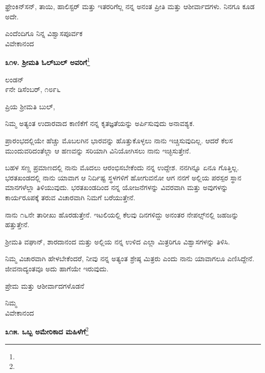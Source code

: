 ಫ್ರೇಂಕಿನ್‌ಸನ್, ತಾಯಿ, ಹಾಲಿಸ್ಟರ್ ಮತ್ತು ಇತರರಿಗೆಲ್ಲ ನನ್ನ ಅನಂತ ಪ್ರೀತಿ ಮತ್ತು ಆಶೀರ್ವಾದಗಳು. ನಿನಗೂ ಕೂಡ ಅದೇ.

\vspace{-0.5cm}

{\flushright
ಎಂದೆಂದಿಗೂ ನಿನ್ನ ವಿಶ್ವಾಸಪೂರ್ವಕ\\ವಿವೇಕಾನಂದ\par}

\begin{center}
\textbf{೩೧೪. ಶ‍್ರೀಮತಿ ಓಲ್‌ಬುಲ್‌ ಅವರಿಗೆ}\footnote{}
\end{center}

\vspace{-0.5cm}

\begin{flushright}
ಲಂಡನ್\\೯ನೇ ಡಿಸೆಂಬರ್, ೧೮೯೬
\end{flushright}

\vspace{-0.3cm}

\noindent
ಪ್ರಿಯ ಶ‍್ರೀಮತಿ ಬುಲ್,

ನಿಮ್ಮ ಅತ್ಯಂತ ಉದಾರವಾದ ಕಾಣಿಕೆಗೆ ನನ್ನ ಕೃತಜ್ಞತೆಯನ್ನು ಅರ್ಪಿಸುವುದು ಅನಾವಶ್ಯಕ.

ಪ್ರಾರಂಭದಲ್ಲಿಯೇ ಹೆಚ್ಚು ಮೊಬಲಗಿನ ಭಾರವನ್ನು ಹೊತ್ತುಕೊಳ್ಳಲು ನಾನು ಇಚ್ಚಿಸುವುದಿಲ್ಲ. ಆದರೆ ಕೆಲಸ ಮುಂದುವರಿದಂತೆಲ್ಲಾ ಆ ಹಣವನ್ನು ಸರಿಯಾಗಿ ವಿನಿಯೋಗಿಸಲು ನಾನು ಇಚ್ಛಿಸುತ್ತೇನೆ.

ಬಹಳ ಸಣ್ಣ ಪ್ರಮಾಣದಲ್ಲಿ ನಾನು ಮೊದಲು ಆರಂಭಿಸಬೇಕೆಂದು ನನ್ನ ಉದ್ದೇಶ. ನನಗಿನ್ನೂ ಏನೂ ಗೊತ್ತಿಲ್ಲ. ಭರತಖಂಡದಲ್ಲಿ ನಾನು ಯಾವಾಗ ಆ ನಿರ್ದಿಷ್ಟ ಸ್ಥಳಗಳಿಗೆ ಹೋಗುವನೋ ಆಗ ನನಗೆ ಅಲ್ಲಿಯ ಪರಸ್ಪರ ಸ್ಥಾನ ಮಾನಗಳೆಲ್ಲಾ ತಿಳಿಯುವುದು. ಭರತಖಂಡದಿಂದ ನನ್ನ ಯೋಜನೆಗಳನ್ನು ವಿವರವಾಗಿ ಮತ್ತು ಅವುಗಳನ್ನು ಕಾರ್ಯರೂಪಕ್ಕೆ ತರುವ ವಿಚಾರವಾಗಿ ನಿಮಗೆ ಬರೆಯುತ್ತೇನೆ.

ನಾನು ೧೬ನೇ ತಾರೀಖು ಹೊರಡುತ್ತೇನೆ. ಇಟಲಿಯಲ್ಲಿ ಕೆಲವು ದಿನಗಳಿದ್ದು ಅನಂತರ ನೇಪಲ್ಸ್‌ನಲ್ಲಿ ಜಹಜನ್ನು ಹತ್ತುತ್ತೇನೆ.

ಶ‍್ರೀಮತಿ ವಘಾನ್, ಶಾರದಾನಂದ ಮತ್ತು ಅಲ್ಲಿಯ ನನ್ನ ಉಳಿದ ಎಲ್ಲಾ ಮಿತ್ರರಿಗೂ ವಿಶ್ವಾಸಗಳನ್ನು ತಿಳಿಸಿ.

ನಿಮ್ಮ ವಿಚಾರವಾಗಿ ಹೇಳಬೇಕೆಂದರೆ, ನೀವು ನನ್ನ ಅತ್ಯಂತ ಶ್ರೇಷ್ಠ ಮಿತ್ರರು ಎಂದು ನಾನು ಯಾವಾಗಲೂ ಎಣಿಸಿದ್ದೇನೆ. ಜೀವನಾದ್ಯಂತವೂ ಅದು ಹಾಗೆಯೇ ಇರುವುದು.

ಪ್ರೇಮ ಮತ್ತು ಆಶೀರ್ವಾದಗಳೊಡನೆ

{\flushright
ನಿಮ್ಮ\\ವಿವೇಕಾನಂದ\par}

\begin{center}
\textbf{೩೧೫. ಒಬ್ಬ ಅಮೇರಿಕಾದ ಮಹಿಳೆಗೆ}\footnote{}
\end{center}

